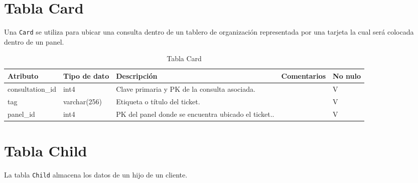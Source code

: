 \section{Tabla Card}\label{sec:table-calendar}
Una \texttt{Card} se utiliza para ubicar una consulta dentro de un tablero de organización representada por una tarjeta la cual será colocada dentro de un panel.

\begin{table}[htbp]
\centering
\label{tab:card}

\begin{tabular}{|p{3cm}|p{2.5cm}|p{4.5cm}|p{4cm}|p{1cm}|}
\hline
\textbf{Atributo} & \textbf{Tipo de dato}  & \textbf{Descripción} & \textbf{Comentarios} & \textbf{No nulo} \\ \hline
consultation\_id & int4 & Clave primaria y PK de la consulta asociada. &  & V \\ \hline
tag & varchar(256) & Etiqueta o título del ticket. &  & V \\ \hline
panel\_id & int4 & PK del panel donde se encuentra ubicado el ticket.. &  & V \\ \hline
\end{tabular}
\caption{Tabla Card}
\end{table}



\section{Tabla Child}\label{sec:table-child}
La tabla \texttt{Child} almacena los datos de un hijo de un cliente.

